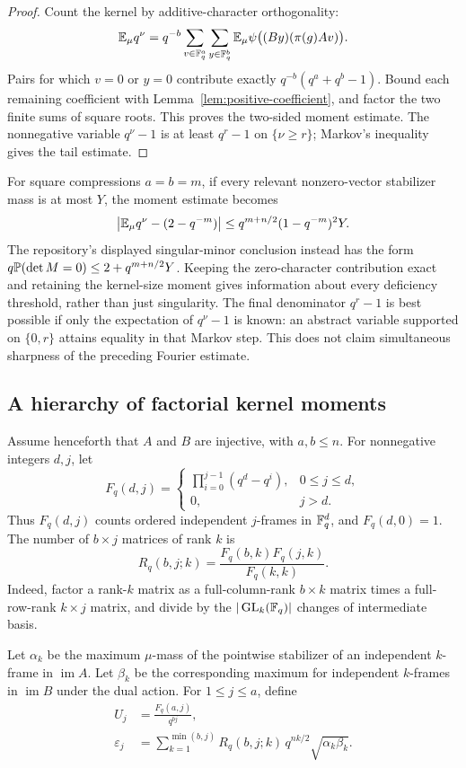 \begin{proof}
Count the kernel by additive-character orthogonality:
\[
 \mathbb E_\mu q^\nu
 =q^{-b}\sum_{v\in\mathbb F_q^a}\sum_{y\in\mathbb F_q^b}
       \mathbb E_\mu\psi\bigl((By)(\pi(g)Av)\bigr).
\]
Pairs for which $v=0$ or $y=0$ contribute exactly
$q^{-b}(q^a+q^b-1)$. Bound each remaining coefficient with
Lemma~\ref{lem:positive-coefficient}, and factor the two finite sums of square
roots. This proves the two-sided moment estimate. The nonnegative variable
$q^\nu-1$ is at least $q^r-1$ on $\{\nu\ge r\}$; Markov's inequality gives
the tail estimate.
\end{proof}

For square compressions $a=b=m$, if every relevant nonzero-vector
stabilizer mass is at most $Y$, the moment estimate becomes
\[
 \left|\mathbb E_\mu q^\nu-(2-q^{-m})\right|
 \le q^{m+n/2}(1-q^{-m})^2Y.
\]
The repository's displayed singular-minor conclusion instead has the form
$q\mathbb P(\det M=0)\le2+q^{m+n/2}Y$. Keeping the zero-character contribution
exact and retaining the kernel-size moment gives information about every
deficiency threshold, rather than just singularity. The final denominator
$q^r-1$ is best possible if only the expectation of $q^\nu-1$ is known:
an abstract variable supported on $\{0,r\}$ attains equality in that Markov
step. This does not claim simultaneous sharpness of the preceding Fourier
estimate.

\subsection{A hierarchy of factorial kernel moments}

Assume henceforth that $A$ and $B$ are injective, with $a,b\le n$.
For nonnegative integers $d,j$, let
\[
 F_q(d,j)=
 \begin{cases}
  \displaystyle\prod_{i=0}^{j-1}(q^d-q^i),&0\le j\le d,\\[3pt]
  0,&j>d.
 \end{cases}
\]
Thus $F_q(d,j)$ counts ordered independent $j$-frames in $\mathbb F_q^d$,
and $F_q(d,0)=1$. The number of $b\times j$ matrices of rank $k$ is
\begin{equation}
 R_q(b,j;k)=\frac{F_q(b,k)F_q(j,k)}{F_q(k,k)}.
 \label{eq:rank-matrix-count}
\end{equation}
Indeed, factor a rank-$k$ matrix as a full-column-rank $b\times k$ matrix
times a full-row-rank $k\times j$ matrix, and divide by the
$|\operatorname{GL}_k(\mathbb F_q)|$ changes of intermediate basis.

Let $\alpha_k$ be the maximum $\mu$-mass of the pointwise stabilizer of
an independent $k$-frame in $\operatorname{im}A$. Let $\beta_k$ be the
corresponding maximum for independent $k$-frames in $\operatorname{im}B$
under the dual action. For $1\le j\le a$, define
\begin{align}
 U_j&=\frac{F_q(a,j)}{q^{bj}},\label{eq:moment-main}\\
 \varepsilon_j
   &=\sum_{k=1}^{\min(b,j)}R_q(b,j;k)\,
          q^{nk/2}\sqrt{\alpha_k\beta_k}.
          \label{eq:moment-epsilon}
\end{align}

